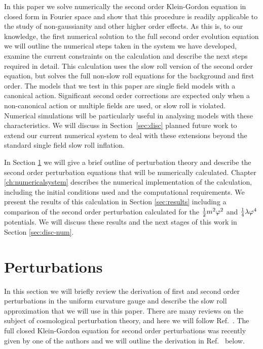 In this paper we 
solve numerically the second order Klein-Gordon
equation in closed form in Fourier space and show that this procedure
is readily applicable to the study of non-gaussianity and other higher
order effects.
%
As this is, to our knowledge, the first numerical solution to the full
second order evolution equation we will outline the numerical steps
taken in the system we have developed, examine the current constraints
on the calculation and describe the next steps required in
detail. This calculation uses the slow roll version of the second
order equation, but solves the full non-slow roll equations for the
background and first order.
% 
The models that we test in this paper are single field models with a canonical
action. Significant second order corrections
are expected only when a non-canonical action or multiple fields are
used, or slow roll is violated. Numerical simulations will be particularly
useful in analysing models with these characteristics.
We will discuss in
Section~\ref{sec:disc} planned future work to extend our current numerical
system to deal with these extensions beyond the standard single field slow roll
inflation.


In Section \ref{sec:perts-num} we will give a brief outline of
perturbation theory and describe the second order perturbation
equations that will be numerically calculated. Chapter
\ref{ch:numericalsystem} describes the numerical implementation of the
calculation, including the initial conditions used and the
computational requirements. We present the results of this calculation
in Section \ref{sec:results} including a comparison of the second
order perturbation calculated for the $\frac{1}{2} m^2 \varphi^2$ and
$\frac{1}{4}\lambda\varphi^4$ potentials. We will discuss these results
and the next stages of this work in Section \ref{sec:disc-num}. 



% 
% 
% 
% 
\section{Perturbations}
\label{sec:perts-num}


In this section we will briefly review the derivation of first and
second order perturbations in the uniform curvature gauge and describe
the slow roll approximation that we will use in this paper. There are
many reviews on the subject of cosmological perturbation theory, and
here we will follow Ref.~\cite{Malik:2008im}.  The full closed
Klein-Gordon equation for second order perturbations was recently
given by one of the authors and we will outline the derivation in
Ref.~\cite{Malik:2006ir} below.

